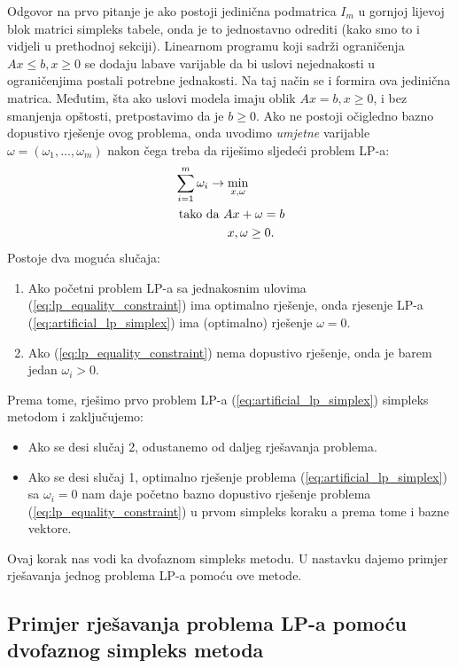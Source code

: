 \documentclass[a4paper, utf8, 11pt, colorlinks]{article}
\begin{document}
 Odgovor na prvo pitanje je ako postoji jedinična podmatrica $I_m$ u gornjoj lijevoj blok matrici simpleks tabele,  onda je to jednostavno odrediti (kako smo to i vidjeli u prethodnoj sekciji). 
 Linearnom programu koji sadrži ograničenja $Ax \leq b, x\geq 0$ se dodaju labave varijable da bi uslovi nejednakosti u ograničenjima postali potrebne jednakosti. Na taj način se i formira ova jedinična matrica. Međutim, šta ako uslovi modela imaju oblik $Ax = b, x \geq 0$, i bez smanjenja opštosti, pretpostavimo da je $b \geq 0$. Ako ne postoji očigledno bazno dopustivo rješenje ovog problema, onda uvodimo \emph{umjetne} varijable $\omega = (\omega_1,\ldots, \omega_m)$ nakon čega treba da riješimo sljedeći problem LP-a:
 \begin{align}
      &\sum_{i=1}^m \omega_i \rightarrow \min_{x,\omega} \nonumber \\
      &\mbox{ tako da } A x + \omega = b \nonumber \\
      & \hspace{1.5cm} x, \omega \geq 0. \label{eq:artificial_lp_simplex}
 \end{align}
Postoje dva moguća slučaja:
\begin{enumerate}
    \item Ako početni problem LP-a sa jednakosnim ulovima (\ref{eq:lp_equality_constraint}) 
          ima optimalno rješenje, onda   rjesenje LP-a (\ref{eq:artificial_lp_simplex}) ima (optimalno) rješenje $\omega = 0$. 
    \item Ako  (\ref{eq:lp_equality_constraint}) nema dopustivo rješenje, onda je barem jedan $\omega_i > 0$.
\end{enumerate}
 Prema tome, rješimo prvo problem LP-a  (\ref{eq:artificial_lp_simplex}) simpleks metodom i zaključujemo:
 \begin{itemize}
      \item Ako se desi slučaj 2, odustanemo od daljeg rješavanja problema.
      \item Ako se desi slučaj 1, optimalno rješenje problema (\ref{eq:artificial_lp_simplex}) sa $\omega_i=0$ nam daje početno bazno dopustivo rješenje problema (\ref{eq:lp_equality_constraint}) u prvom simpleks koraku a prema tome i bazne vektore. 
 \end{itemize} 
 Ovaj korak nas vodi ka dvofaznom simpleks metodu. U nastavku dajemo primjer rješavanja jednog problema LP-a pomoću ove metode.      
      
 \subsection{Primjer rješavanja problema LP-a pomoću dvofaznog simpleks metoda}     
 
\end{document}

